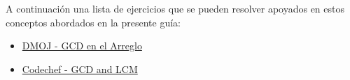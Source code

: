 A continuación una lista de ejercicios que se pueden resolver apoyados en estos conceptos abordados en la presente guía:

\begin{itemize}
	\item \href{https://dmoj.uclv.edu.cu/problem/onlinegcd}{DMOJ - GCD en el Arreglo}
	\item \href{https://www.codechef.com/problems/FLOW016}{Codechef - GCD and LCM}
\end{itemize}